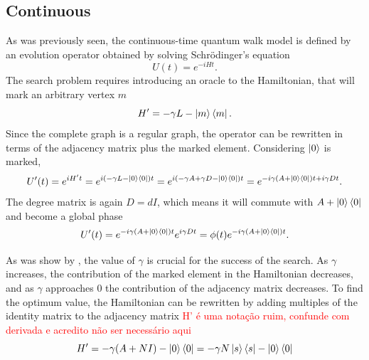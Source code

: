              \subsection{Continuous}
                As was previously seen, the continuous-time quantum walk model is defined by an evolution operator obtained by solving Schrödinger's equation
                \begin{equation}
                    U(t) = e^{-iHt}.
                \end{equation}
                The search problem requires introducing an oracle to the Hamiltonian, that will mark an arbitrary vertex $m$ %
                \begin{equation}
                    H' = -\gamma L - \ket{m}\bra{m}.
                \end{equation}
                Since the complete graph is a regular graph, the operator can be rewritten in terms of the adjacency matrix plus the marked element. Considering $\ket{0}$ is marked,
                \begin{equation}
                   U'(t) = e^{iH't} = e^{i(-\gamma L - \ket{0}\bra{0})t} = e^{i(-\gamma A + \gamma D - \ket{0}\bra{0})t} = e^{-i\gamma(A+\ket{0}\bra{0})t + i\gamma D t}.
                \end{equation}
                The degree matrix is again $D=dI$, which means it will commute with $A+\ket{0}\bra{0}$ and become a global phase
                \begin{equation}
                U'(t) = e^{-i\gamma(A+\ket{0}\bra{0})t}e^{i\gamma D t} = \phi(t)e^{-i\gamma(A+\ket{0}\bra{0})t}.
                \end{equation}\par
                As was show by \cite{zalka1999}, the value of $\gamma$ is crucial for the success of the search. As $\gamma$ increases, the contribution of the marked element in the Hamiltonian decreases, and as $\gamma$ approaches $0$ the contribution of the adjacency matrix decreases. To find the optimum value, the Hamiltonian can be rewritten by adding multiples of the identity matrix to the adjacency matrix \textcolor{red}{H' é uma notação ruim, confunde com derivada e acredito não ser necessário aqui}
                \begin{equation}
                    H' = -\gamma(A+NI) - \ket{0}\bra{0} = -\gamma N\ket{s}\bra{s} - \ket{0}\bra{0}
                \end{equation}
